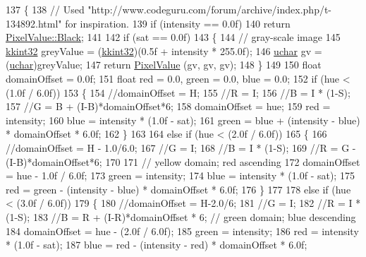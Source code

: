 \begin{DoxyCode}
137 \{
138   \textcolor{comment}{// Used "http://www.codeguru.com/forum/archive/index.php/t-134892.html"  for inspiration.}
139   \textcolor{keywordflow}{if}  (intensity == 0.0f) 
140     \textcolor{keywordflow}{return} \hyperlink{class_k_k_b_1_1_pixel_value_af2eb1c2546e02ff0f6c14ab76e604e19}{PixelValue::Black};
141 
142   \textcolor{keywordflow}{if}  (sat == 0.0f) 
143   \{
144     \textcolor{comment}{// gray-scale image}
145     \hyperlink{namespace_k_k_b_a8fa4952cc84fda1de4bec1fbdd8d5b1b}{kkint32}  greyValue = (\hyperlink{namespace_k_k_b_a8fa4952cc84fda1de4bec1fbdd8d5b1b}{kkint32})(0.5f + intensity * 255.0f);
146     \hyperlink{namespace_k_k_b_ace9969169bf514f9ee6185186949cdf7}{uchar}  gv = (\hyperlink{namespace_k_k_b_ace9969169bf514f9ee6185186949cdf7}{uchar})greyValue;
147     \textcolor{keywordflow}{return}  \hyperlink{class_k_k_b_1_1_pixel_value_a3e6b509cdcc604c2df9cdde0d9b7f30e}{PixelValue} (gv, gv, gv);
148   \}
149 
150   \textcolor{keywordtype}{float}  domainOffset = 0.0f;
151   \textcolor{keywordtype}{float}  red = 0.0, green = 0.0, blue = 0.0;
152   \textcolor{keywordflow}{if}  (hue < (1.0f / 6.0f)) 
153   \{ 
154     \textcolor{comment}{//domainOffset = H;}
155     \textcolor{comment}{//R = I;}
156     \textcolor{comment}{//B = I * (1-S);}
157     \textcolor{comment}{//G = B + (I-B)*domainOffset*6;}
158     domainOffset = hue;
159     red  = intensity;
160     blue = intensity * (1.0f - sat);
161     green = blue + (intensity - blue) * domainOffset * 6.0f;
162   \}
163   
164   \textcolor{keywordflow}{else} \textcolor{keywordflow}{if}  (hue < (2.0f / 6.0f)) 
165   \{
166     \textcolor{comment}{//domainOffset = H - 1.0/6.0;}
167     \textcolor{comment}{//G = I;}
168     \textcolor{comment}{//B = I * (1-S);}
169     \textcolor{comment}{//R = G - (I-B)*domainOffset*6;}
170 
171     \textcolor{comment}{// yellow domain; red ascending}
172     domainOffset = hue - 1.0f / 6.0f;
173     green = intensity;
174     blue = intensity * (1.0f - sat);
175     red = green - (intensity - blue) * domainOffset * 6.0f;
176   \}
177 
178   \textcolor{keywordflow}{else} \textcolor{keywordflow}{if}  (hue < (3.0f / 6.0f))
179   \{
180     \textcolor{comment}{//domainOffset = H-2.0/6;}
181     \textcolor{comment}{//G = I;}
182     \textcolor{comment}{//R = I * (1-S);}
183     \textcolor{comment}{//B = R + (I-R)*domainOffset * 6;    // green domain; blue descending}
184     domainOffset = hue - (2.0f / 6.0f);
185     green = intensity;
186     red = intensity * (1.0f - sat);
187     blue = red - (intensity - red) * domainOffset * 6.0f;

\end{DoxyCode}
